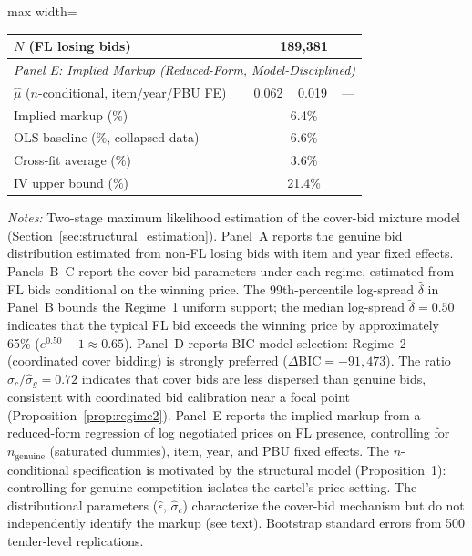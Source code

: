 \begin{table}[htbp]
\begin{adjustbox}{max width=\textwidth}
\begin{threeparttable}
\begin{tabular}{lccc}
$N$ (FL losing bids) & \multicolumn{3}{c}{189,381} \\
\midrule
\multicolumn{4}{l}{\textit{Panel E: Implied Markup (Reduced-Form, Model-Disciplined)}} \\[3pt] %
$\hat{\mu}$ ($n$-conditional, item/year/PBU FE) & 0.062 & 0.019 & --- \\
Implied markup (\%) & \multicolumn{3}{c}{6.4\%} \\
OLS baseline (\%, collapsed data) & \multicolumn{3}{c}{6.6\%} \\
Cross-fit average (\%) & \multicolumn{3}{c}{3.6\%} \\
IV upper bound (\%) & \multicolumn{3}{c}{21.4\%} \\
\bottomrule
\end{tabular}
\begin{tablenotes}
\small
\item \textit{Notes:} Two-stage maximum likelihood estimation of the cover-bid
mixture model (Section~\ref{sec:structural_estimation}). Panel~A reports the
genuine bid distribution estimated from non-FL losing bids with item and year
fixed effects. Panels~B--C report the cover-bid parameters under each regime,
estimated from FL bids conditional on the winning price. The 99th-percentile
log-spread $\hat{\delta}$ in Panel~B bounds the Regime~1 uniform support;
the median log-spread $\tilde{\delta} = 0.50$ indicates that the typical FL
bid exceeds the winning price by approximately 65\%
($e^{0.50} - 1 \approx 0.65$). Panel~D reports BIC model selection: Regime~2
(coordinated cover bidding) is strongly preferred ($\Delta\text{BIC} =
-91{,}473$). The ratio $\hat{\sigma}_c / \hat{\sigma}_g = 0.72$ indicates
that cover bids are less dispersed than genuine bids, consistent with
coordinated bid calibration near a focal point (Proposition~\ref{prop:regime2}).
Panel~E reports the implied markup from a reduced-form regression
of log negotiated prices on FL presence, controlling for
$n_{\text{genuine}}$ (saturated dummies), item, year, and PBU fixed
effects. The $n$-conditional specification is motivated by the
structural model (Proposition~1): controlling for genuine competition
isolates the cartel's price-setting. The distributional parameters
($\hat{\epsilon}$, $\hat{\sigma}_c$) characterize the cover-bid
mechanism but do not independently identify the markup (see text).
Bootstrap standard errors from 500 tender-level replications.
\end{tablenotes}
\end{threeparttable}
\end{adjustbox}
\end{table}
